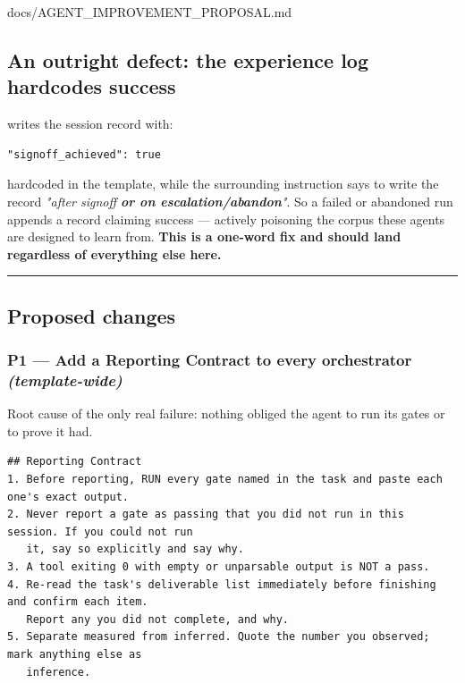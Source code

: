 \begin{relocated}{docs/AGENT_IMPROVEMENT_PROPOSAL.md}
\subsection{An outright defect: the experience log hardcodes success}\label{tm:dec:agent-improvement-proposal:2-an-outright-defect-the-experience-log-hardcodes-success}

writes the session record with:

\begin{lstlisting}[language={}]
"signoff_achieved": true
\end{lstlisting}

hardcoded in the template, while the surrounding instruction says to
write the record \emph{"after signoff \textbf{or on
escalation/\allowbreak{}abandon}"}. So a failed or abandoned run appends
a record claiming success --- actively poisoning the
 corpus these agents are designed to
learn from. \textbf{This is a one-word fix and should land regardless of
everything else here.}

\begin{center}\rule{0.5\linewidth}{0.5pt}\end{center}

\subsection{Proposed changes}\label{tm:dec:agent-improvement-proposal:proposed-changes}

\subsubsection{\texorpdfstring{P1 --- Add a Reporting Contract to every
orchestrator
\emph{(template-wide)}}{P1 --- Add a Reporting Contract to every orchestrator (template-wide)}}\label{tm:dec:agent-improvement-proposal:p1-add-a-reporting-contract-to-every-orchestrator-template-wide}

Root cause of the only real failure: nothing obliged the agent to run
its gates or to prove it had.

\begin{lstlisting}[language={}]
## Reporting Contract
1. Before reporting, RUN every gate named in the task and paste each one's exact output.
2. Never report a gate as passing that you did not run in this session. If you could not run
   it, say so explicitly and say why.
3. A tool exiting 0 with empty or unparsable output is NOT a pass.
4. Re-read the task's deliverable list immediately before finishing and confirm each item.
   Report any you did not complete, and why.
5. Separate measured from inferred. Quote the number you observed; mark anything else as
   inference.
\end{lstlisting}


\end{relocated}
